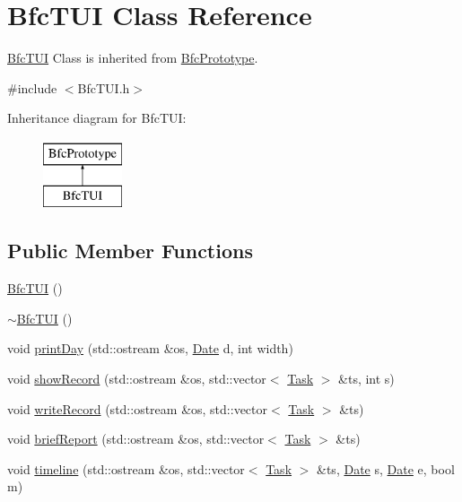 \hypertarget{classBfcTUI}{\section{Bfc\-T\-U\-I Class Reference}
\label{classBfcTUI}
}


\hyperlink{classBfcTUI}{Bfc\-T\-U\-I} Class is inherited from \hyperlink{classBfcPrototype}{Bfc\-Prototype}.  




{\ttfamily \#include $<$Bfc\-T\-U\-I.\-h$>$}

Inheritance diagram for Bfc\-T\-U\-I\-:\begin{figure}[H]
\begin{center}
\leavevmode
\includegraphics[height=2.000000cm]{classBfcTUI}
\end{center}
\end{figure}
\subsection*{Public Member Functions}
\begin{DoxyCompactItemize}
\item 
\hyperlink{classBfcTUI_aec4a74685e13990672018efe38f63cd8}{Bfc\-T\-U\-I} ()
\item 
\hyperlink{classBfcTUI_adff8e447a86fd73ead506f7d4da38646}{$\sim$\-Bfc\-T\-U\-I} ()
\item 
void \hyperlink{classBfcTUI_a4034a1a0e50d24ca3da16683ca7a0bd1}{print\-Day} (std\-::ostream \&os, \hyperlink{classDate}{Date} d, int width)
\item 
void \hyperlink{classBfcTUI_a50402f167049c054ba2512374e7e0b03}{show\-Record} (std\-::ostream \&os, std\-::vector$<$ \hyperlink{classTask}{Task} $>$ \&ts, int s)
\item 
void \hyperlink{classBfcTUI_a1c446b91f4f250d4b4f5f255e207c88e}{write\-Record} (std\-::ostream \&os, std\-::vector$<$ \hyperlink{classTask}{Task} $>$ \&ts)
\item 
void \hyperlink{classBfcTUI_a5577e09a7a8b9df3d4ab1edf8bcdd5f4}{brief\-Report} (std\-::ostream \&os, std\-::vector$<$ \hyperlink{classTask}{Task} $>$ \&ts)
\item 
void \hyperlink{classBfcTUI_a816b7be298cd8f33001748f1d54b4297}{timeline} (std\-::ostream \&os, std\-::vector$<$ \hyperlink{classTask}{Task} $>$ \&ts, \hyperlink{classDate}{Date} s, \hyperlink{classDate}{Date} e, bool m)
\end{DoxyCompactItemize}
